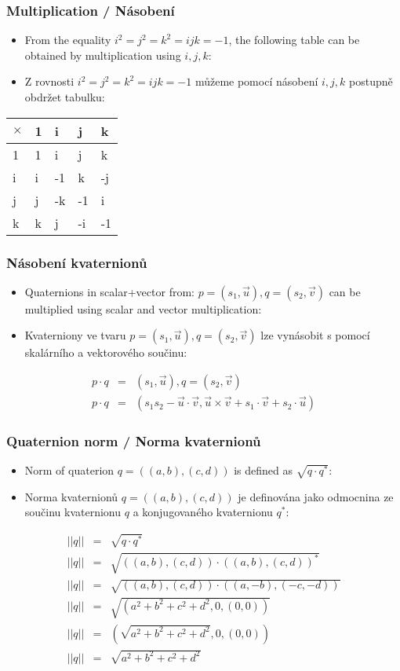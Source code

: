 \begin{frame}\frametitle{Multiplication / Násobení}\scriptsize
\begin{itemize}
\item From the equality $i^2=j^2=k^2=ijk=-1$, the following table can be obtained by multiplication using $i,j,k$:
\item Z rovnosti $i^2=j^2=k^2=ijk=-1$ můžeme pomocí násobení $i,j,k$ postupně obdržet tabulku:
\end{itemize}
\begin{table}
\centering
\begin{tabular}{ |l||l|l|l|l| }
\hline
$\times$ & 1 & i & j & k \\
\hline
\hline
1 & 1 &  i &  j &  k \\
\hline
i & i & -1 &  k & -j \\
\hline
j & j & -k & -1 &  i \\
\hline
k & k &  j & -i & -1 \\
\hline
\end{tabular}
\end{table}
\end{frame}

\begin{frame}\frametitle{Násobení kvaternionů}\scriptsize
\begin{itemize}
\item Quaternions in scalar+vector from: $p=(s_1,\vec u),q=(s_2,\vec v)$ can be multiplied using scalar and vector multiplication:
\item Kvaterniony ve tvaru $p=(s_1,\vec u),q=(s_2,\vec v)$ lze vynásobit s pomocí skalárního a vektorového součinu:
\end{itemize}
\begin{eqnarray*}
p\cdot q &=& (s_1,\vec u),q=(s_2,\vec v)\\
p\cdot q &=& (s_1s_2-\vec u\cdot \vec v,\vec u \times \vec v + s_1\cdot \vec v + s_2 \cdot \vec u)
\end{eqnarray*}
\end{frame}

\begin{frame}\frametitle{Quaternion norm / Norma kvaternionů}\scriptsize
\begin{itemize}
  \item Norm of quaterion $q=((a,b),(c,d))$ is defined as  $\sqrt{q \cdot q^*}$:
  \item Norma kvaternionů $q=((a,b),(c,d))$ je definována jako odmocnina ze součinu kvaternionu $q$ a konjugovaného kvaternionu $q^*$:
\end{itemize}
\begin{eqnarray*}
||q|| &=& \sqrt{q \cdot q^*}\\
||q|| &=& \sqrt{((a,b),(c,d)) \cdot ((a,b),(c,d))^*}\\
||q|| &=& \sqrt{((a,b),(c,d)) \cdot ((a,-b),(-c,-d))}\\
||q|| &=& \sqrt{(a^2+b^2+c^2+d^2,0,(0,0))}\\
||q|| &=& (\sqrt{a^2+b^2+c^2+d^2},0,(0,0))\\
||q|| &=& \sqrt{a^2+b^2+c^2+d^2}
\end{eqnarray*}

\end{frame}

